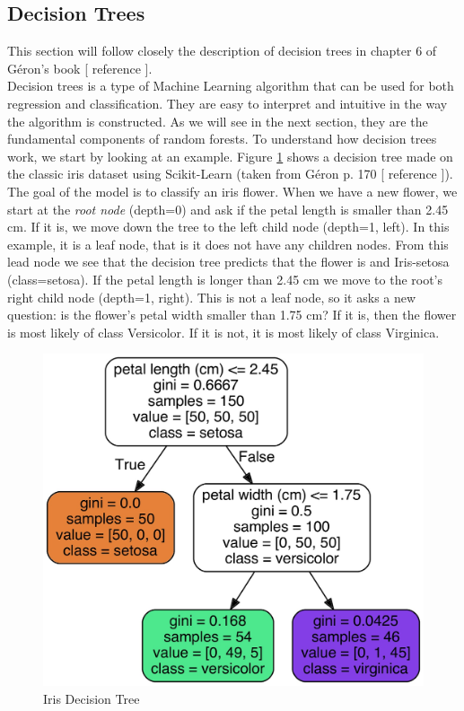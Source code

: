 \documentclass[12pt]{article}
\numberwithin{figure}{section}
\newcommand{\husk}[1]{\color{red} #1 \color{black}}
\begin{document}
\subsection{Decision Trees}
This section will follow closely the description of decision trees in chapter 6 of Géron's book [\husk{reference}].\\
Decision trees is a type of Machine Learning algorithm that can be used for both regression and classification. They are easy to interpret and intuitive in the way the algorithm is constructed. As we will see in the next section, they are the fundamental components of random forests. To understand how decision trees work, we start by looking at an example. Figure \ref{figT:iris_tree} shows a decision tree made on the classic iris dataset using Scikit-Learn (taken from Géron p. 170 [\husk{reference}]). The goal of the model is to classify an iris flower. When we have a new flower, we start at the \textit{root node} (depth=0) and ask if the petal length is smaller than 2.45 cm. If it is, we move down the tree to the left child node (depth=1, left). In this example, it is a leaf node, that is it does not have any children nodes. From this lead node we see that the decision tree predicts that the flower is and Iris-setosa (class=setosa). If the petal length is longer than 2.45 cm we move to the root's right child node (depth=1, right). This is not a leaf node, so it asks a new question: is the flower's petal width smaller than 1.75 cm? If it is, then the flower is most likely of class Versicolor. If it is not, it is most likely of class Virginica.\\ 
\begin{figure}[H]
\centering
\includegraphics[width=0.8\linewidth]{decision-tree-iris.jpg}
\caption{Iris Decision Tree}
\label{figT:iris_tree}
\end{figure}
\end{document}
